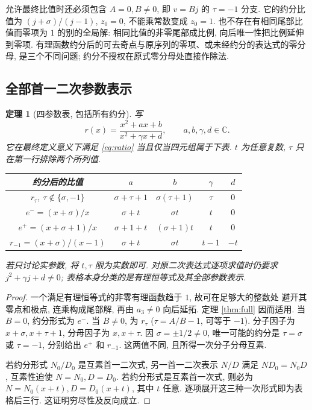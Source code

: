 \documentclass[UTF8]{ctexart}
\newtheorem{theorem}{定理}[section]
\newcommand{\sig}{\sigma}
\begin{document}
允许最终比值时还必须包含 $A=0,B\ne0$, 即 $v=Bj$ 的 $\tau=-1$ 分支.
它的约分比值为 $(j+\sig)/(j-1)$, $z_0=0$, 不能乘常数变成 $z_0=1$.
也不存在有相同尾部比值而零项为 $1$ 的别的全局解:
相同比值的非零尾部成比例, 向后唯一性把比例延伸到零项.
有理函数约分后的可去奇点与原序列的零项、或未经约分的表达式的零分母,
是三个不同问题; 约分不授权在原式零分母处直接作除法.

\subsection{全部首一二次参数表示}

\begin{theorem}[四参数表, 包括所有约分]\label{thm:free}
 写
\[
 r(x)=\frac{x^2+ax+b}{x^2+\gamma x+d},\qquad a,b,\gamma,d\in\mathbb C.
\]
 它在最终定义意义下满足 \eqref{eq:ratio} 当且仅当四元组属于下表.
 $t$ 为任意复数, $\tau$ 只在第一行排除两个所列值.
\begin{center}
\begin{tabular}{c|cccc}
约分后的比值 & $a$ & $b$ & $\gamma$ & $d$\\\hline
$r_\tau$, $\tau\notin\{\sig,-1\}$
 & $\sig+\tau+1$ & $\sig(\tau+1)$ & $\tau$ & $0$\\
$e^-=(x+\sig)/x$ & $\sig+t$ & $\sig t$ & $t$ & $0$\\
$e^+=(x+\sig+1)/x$ & $\sig+1+t$ & $(\sig+1)t$ & $t$ & $0$\\
$r_{-1}=(x+\sig)/(x-1)$ & $\sig+t$ & $\sig t$ & $t-1$ & $-t$
\end{tabular}
\end{center}
 若只讨论实参数, 将 $t,\tau$ 限为实数即可.
 对原二次表达式逐项求值时仍要求 $j^2+\gamma j+d\ne0$;
 表格本身分类的是有理恒等式及其全部参数表示.
\end{theorem}
\begin{proof}
 一个满足有理恒等式的非零有理函数趋于 $1$, 故可在足够大的整数处
 避开其零点和极点, 连乘构成尾部解, 再由 $a_3\ne0$ 向后延拓.
 定理 \ref{thm:full} 因而适用.
 当 $B=0$, 约分形式为 $e^-$.
 当 $B\ne0$, 为 $r_\tau$ ($\tau=A/B-1$, 可等于 $-1$).
 分子因子为 $x+\sig,x+\tau+1$, 分母因子为 $x,x+\tau$.
 因 $\sig=\pm1/2\ne0$, 唯一可能的约分是
 $\tau=\sig$ 或 $\tau=-1$, 分别给出 $e^+$ 和 $r_{-1}$.
 这两值不同, 且所得一次分子分母互素.

 若约分形式 $N_0/D_0$ 是互素首一二次式, 另一首一二次表示
 $N/D$ 满足 $ND_0=N_0D$, 互素性迫使 $N=N_0,D=D_0$.
 若约分形式是互素首一次式, 则必为
 $N=N_0(x+t),D=D_0(x+t)$, 其中 $t$ 任意.
 逐项展开这三种一次形式即为表格后三行. 这证明穷尽性及反向成立.
\end{proof}
\end{document}
